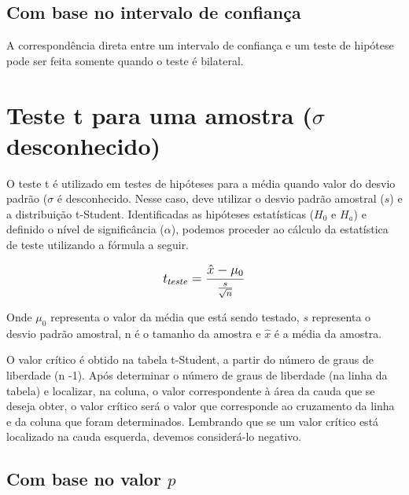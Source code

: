 \subsection{Com base no intervalo de confiança}

A correspondência direta entre um intervalo de confiança e um teste de hipótese pode ser feita somente quando o teste é bilateral.

\section{Teste t para uma amostra (\(\sigma\) desconhecido)}

O teste t é utilizado em testes de hipóteses para a média quando valor do desvio padrão (\(\sigma\) é desconhecido. Nesse caso, deve utilizar o desvio padrão amostral (\(s\)) e a distribuição t-Student. Identificadas as hipóteses estatísticas (\(H_0\) e \(H_a\)) e definido o nível de significância (\(\alpha\)), podemos proceder ao cálculo da estatística de teste utilizando a fórmula a seguir.

\[\beq{ t_{teste} = \frac{\hat{x}-\mu_0}{\frac{s}{\sqrt{n}}} } \]

Onde \(\mu_0\) representa o valor da média que está sendo testado, \(s\) representa o desvio padrão amostral, n é o tamanho da amostra e \(\hat{x}\) é a média da amostra.

O valor crítico é obtido na tabela t-Student, a partir do número de graus de liberdade (n -1). Após determinar o número de graus de liberdade (na linha da tabela) e localizar, na coluna, o valor correspondente à área da cauda que se deseja obter, o valor crítico será o valor que corresponde ao cruzamento da linha e da coluna que foram determinados. Lembrando que se um valor crítico está localizado na cauda esquerda, devemos considerá-lo negativo.

\subsection{Com base no valor \(p\)}

